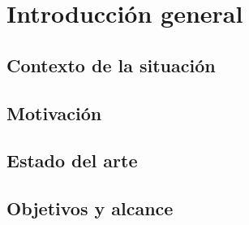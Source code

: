 \chapter{Introducción general} %

\section{Contexto de la situación}


\section{Motivación}


\section{Estado del arte}


\section{Objetivos y alcance}

